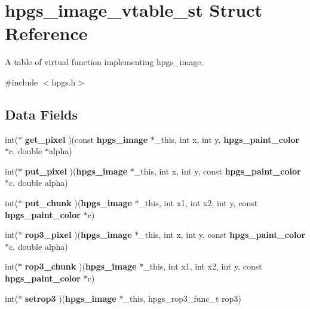 \section{hpgs\_\-image\_\-vtable\_\-st Struct Reference}
\label{structhpgs__image__vtable__st}


A table of virtual function implementing {\ttfamily hpgs\_\-image}.  




{\ttfamily \#include $<$hpgs.h$>$}

\subsection*{Data Fields}
\begin{DoxyCompactItemize}
\item 
int($\ast$ {\bfseries get\_\-pixel} )(const {\bf hpgs\_\-image} $\ast$\_\-this, int x, int y, {\bf hpgs\_\-paint\_\-color} $\ast$c, double $\ast$alpha)\label{structhpgs__image__vtable__st_a24697076d67611f88835060e2f30884d}

\item 
int($\ast$ {\bfseries put\_\-pixel} )({\bf hpgs\_\-image} $\ast$\_\-this, int x, int y, const {\bf hpgs\_\-paint\_\-color} $\ast$c, double alpha)\label{structhpgs__image__vtable__st_a66e1b74c2607eb37f62167bb17e32b39}

\item 
int($\ast$ {\bfseries put\_\-chunk} )({\bf hpgs\_\-image} $\ast$\_\-this, int x1, int x2, int y, const {\bf hpgs\_\-paint\_\-color} $\ast$c)\label{structhpgs__image__vtable__st_a2f20abbb1d3ac9d59ff6068719a89c1c}

\item 
int($\ast$ {\bfseries rop3\_\-pixel} )({\bf hpgs\_\-image} $\ast$\_\-this, int x, int y, const {\bf hpgs\_\-paint\_\-color} $\ast$c, double alpha)\label{structhpgs__image__vtable__st_af1ba1936b0a98b83080709f817f4934a}

\item 
int($\ast$ {\bfseries rop3\_\-chunk} )({\bf hpgs\_\-image} $\ast$\_\-this, int x1, int x2, int y, const {\bf hpgs\_\-paint\_\-color} $\ast$c)\label{structhpgs__image__vtable__st_a3b083af8bdb207c73d8a8a632be8a604}

\item 
int($\ast$ {\bfseries setrop3} )({\bf hpgs\_\-image} $\ast$\_\-this, hpgs\_\-rop3\_\-func\_\-t rop3)\label{structhpgs__image__vtable__st_abd1080e2297c9d0debe6281186c2f003}


\end{DoxyCompactItemize}
